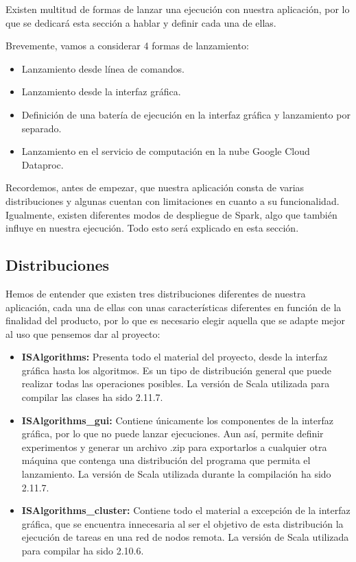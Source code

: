 Existen multitud de formas de lanzar una ejecución con nuestra aplicación, por lo que se dedicará esta sección a hablar y definir cada una de ellas.

Brevemente, vamos a considerar 4 formas de lanzamiento:

\begin{itemize}
	\item Lanzamiento desde línea de comandos.
	\item Lanzamiento desde la interfaz gráfica.
	\item Definición de una batería de ejecución en la interfaz gráfica y lanzamiento por separado.
	\item Lanzamiento en el servicio de computación en la nube Google Cloud Dataproc.
\end{itemize}

Recordemos, antes de empezar, que nuestra aplicación consta de varias distribuciones y algunas cuentan con limitaciones en cuanto a su funcionalidad. Igualmente, existen diferentes modos de despliegue de Spark, algo que también influye en nuestra ejecución. Todo esto será explicado en esta sección.

\subsection{Distribuciones}\label{subsec:distribuciones}

Hemos de entender que existen tres distribuciones diferentes de nuestra aplicación, cada una de ellas con unas características diferentes en función de la finalidad del producto, por lo que es necesario elegir aquella que se adapte mejor al uso que pensemos dar al proyecto:

\begin{itemize}
	\item \textbf{ISAlgorithms:} Presenta todo el material del proyecto, desde la interfaz gráfica hasta los algoritmos. Es un tipo de distribución general que puede realizar todas las operaciones posibles. La versión de Scala utilizada para compilar las clases ha sido 2.11.7.
	\item \textbf{ISAlgorithms\_gui:} Contiene únicamente los componentes de la interfaz gráfica, por lo que no puede lanzar ejecuciones. Aun así, permite definir experimentos y generar un archivo .zip para exportarlos a cualquier otra máquina que contenga una distribución del programa que permita el lanzamiento. La versión de Scala utilizada durante la compilación ha sido 2.11.7.
	\item \textbf{ISAlgorithms\_cluster:} Contiene todo el material a excepción de la interfaz gráfica, que se encuentra innecesaria al ser el objetivo de esta distribución la ejecución de tareas en una red de nodos remota. La versión de Scala utilizada para compilar ha sido 2.10.6.
\end{itemize}

